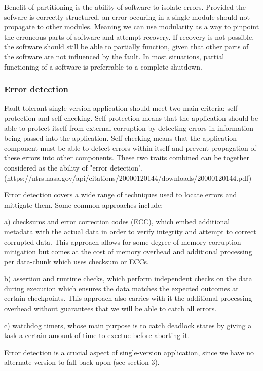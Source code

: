\documentclass[12pt, letterpaper]{article}
\begin{document}
Benefit of partitioning is the ability of software to isolate errors. Provided the sofware is correctly structured, an error occuring in a single module should not propagate to other modules. Meaning we can use modularity as a way to pinpoint the erroneous parts of software and attempt recovery. If recovery is not possible, the software should still be able to partially function, given that other parts of the software are not influenced by the fault. In most situations, partial functioning of a software is preferrable to a complete shutdown.

\subsubsection{Error detection}

Fault-tolerant single-version application should meet two main criteria: self-protection and self-checking. Self-protection means that the application should be able to protect itself from external corruption by detecting errors in information being passed into the application. Self-checking means that the application component must be able to detect errors within itself and prevent propagation of these errors into other components. These two traits combined can be together considered as the ability of "error detection".
(https://ntrs.nasa.gov/api/citations/20000120144/downloads/20000120144.pdf)

Error detection covers a wide range of techniques used to locate errors and mittigate them. Some common approaches include:

a) checksums and error correction codes (ECC), which embed additional metadata with the actual data in order to verify integrity and attempt to correct corrupted data. This approach allows for some degree of memory corruption mitigation but comes at the cost of memory overhead and additional processing per data-chunk which uses checksum or ECCs.

b) assertion and runtime checks, which perform independent checks on the data during execution which ensures the data matches the expected outcomes at certain checkpoints. This approach also carries with it the additional processing overhead without guarantees that we will be able to catch all errors.

c) watchdog timers, whose main purpose is to catch deadlock states by giving a task a certain amount of time to exectue before aborting it.

Error detection is a crucial aspect of single-version application, since we have no alternate version to fall back upon (see section 3).
\end{document}
